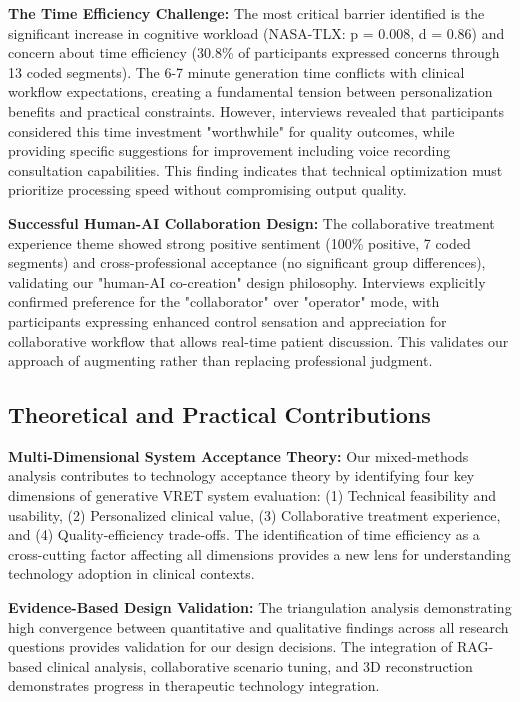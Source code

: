\documentclass[]{interact}
\begin{document}
\textbf{The Time Efficiency Challenge:} The most critical barrier identified is the significant increase in cognitive workload (NASA-TLX: p = 0.008, d = 0.86) and concern about time efficiency (30.8\% of participants expressed concerns through 13 coded segments). The 6-7 minute generation time conflicts with clinical workflow expectations, creating a fundamental tension between personalization benefits and practical constraints. However, interviews revealed that participants considered this time investment "worthwhile" for quality outcomes, while providing specific suggestions for improvement including voice recording consultation capabilities. This finding indicates that technical optimization must prioritize processing speed without compromising output quality.

\textbf{Successful Human-AI Collaboration Design:} The collaborative treatment experience theme showed strong positive sentiment (100\% positive, 7 coded segments) and cross-professional acceptance (no significant group differences), validating our "human-AI co-creation" design philosophy. Interviews explicitly confirmed preference for the "collaborator" over "operator" mode, with participants expressing enhanced control sensation and appreciation for collaborative workflow that allows real-time patient discussion. This validates our approach of augmenting rather than replacing professional judgment.

\subsection{Theoretical and Practical Contributions}

\textbf{Multi-Dimensional System Acceptance Theory:} Our mixed-methods analysis contributes to technology acceptance theory by identifying four key dimensions of generative VRET system evaluation: (1) Technical feasibility and usability, (2) Personalized clinical value, (3) Collaborative treatment experience, and (4) Quality-efficiency trade-offs. The identification of time efficiency as a cross-cutting factor affecting all dimensions provides a new lens for understanding technology adoption in clinical contexts.

\textbf{Evidence-Based Design Validation:} The triangulation analysis demonstrating high convergence between quantitative and qualitative findings across all research questions provides validation for our design decisions. The integration of RAG-based clinical analysis, collaborative scenario tuning, and 3D reconstruction demonstrates progress in therapeutic technology integration.
\end{document}
